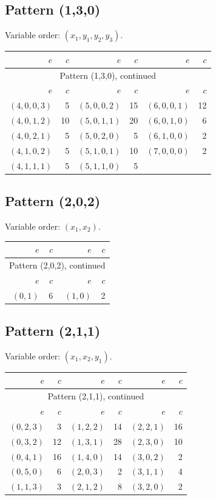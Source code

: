 \subsection{Pattern (1,3,0)}
Variable order: $(x_{1}, y_{1}, y_{2}, y_{3})$.
\begingroup\small
\setlength{\tabcolsep}{8pt}
\begin{longtable}{@{}rr@{\qquad}rr@{\qquad}rr@{}}
\toprule
$e$&$c$&$e$&$c$&$e$&$c$\\\midrule
\endfirsthead
\multicolumn{6}{c}{Pattern (1,3,0), continued}\\
\toprule
$e$&$c$&$e$&$c$&$e$&$c$\\\midrule
\endhead
$(4,0,0,3)$&5&$(5,0,0,2)$&15&$(6,0,0,1)$&12\\
$(4,0,1,2)$&10&$(5,0,1,1)$&20&$(6,0,1,0)$&6\\
$(4,0,2,1)$&5&$(5,0,2,0)$&5&$(6,1,0,0)$&2\\
$(4,1,0,2)$&5&$(5,1,0,1)$&10&$(7,0,0,0)$&2\\
$(4,1,1,1)$&5&$(5,1,1,0)$&5&&\\
\bottomrule
\end{longtable}
\endgroup
\subsection{Pattern (2,0,2)}
Variable order: $(x_{1}, x_{2})$.
\begingroup\small
\setlength{\tabcolsep}{8pt}
\begin{longtable}{@{}rr@{\qquad}rr@{}}
\toprule
$e$&$c$&$e$&$c$\\\midrule
\endfirsthead
\multicolumn{4}{c}{Pattern (2,0,2), continued}\\
\toprule
$e$&$c$&$e$&$c$\\\midrule
\endhead
$(0,1)$&6&$(1,0)$&2\\
\bottomrule
\end{longtable}
\endgroup
\subsection{Pattern (2,1,1)}
Variable order: $(x_{1}, x_{2}, y_{1})$.
\begingroup\small
\setlength{\tabcolsep}{8pt}
\begin{longtable}{@{}rr@{\qquad}rr@{\qquad}rr@{}}
\toprule
$e$&$c$&$e$&$c$&$e$&$c$\\\midrule
\endfirsthead
\multicolumn{6}{c}{Pattern (2,1,1), continued}\\
\toprule
$e$&$c$&$e$&$c$&$e$&$c$\\\midrule
\endhead
$(0,2,3)$&3&$(1,2,2)$&14&$(2,2,1)$&16\\
$(0,3,2)$&12&$(1,3,1)$&28&$(2,3,0)$&10\\
$(0,4,1)$&16&$(1,4,0)$&14&$(3,0,2)$&2\\
$(0,5,0)$&6&$(2,0,3)$&2&$(3,1,1)$&4\\
$(1,1,3)$&3&$(2,1,2)$&8&$(3,2,0)$&2\\
\bottomrule
\end{longtable}
\endgroup
